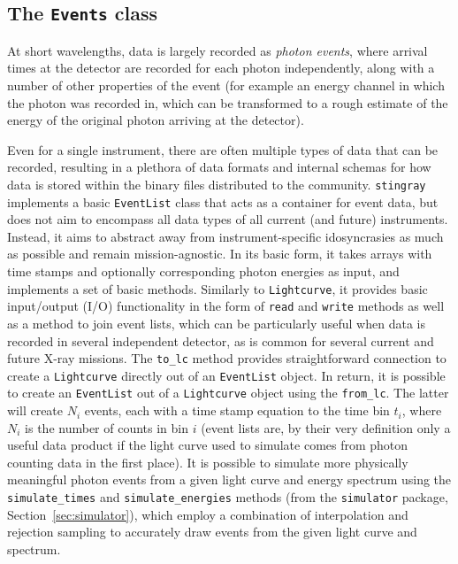 \documentclass[twocolumn]{aastex62}
\newcommand{\stingray}{\texttt{stingray}\xspace}
\newcommand{\lightcurve}{\texttt{Lightcurve}\xspace}
\newcommand{\eventlist}{\texttt{EventList}\xspace}
\begin{document}
\subsection{The \texttt{Events} class}

At short wavelengths, data is largely recorded as \textit{photon events}, where arrival times at the detector are recorded for each photon independently, along with a number of other properties of the event (for example an energy channel in which the photon was recorded in, which can be transformed to a rough estimate of the energy of the original photon arriving at the detector).

Even for a single instrument, there are often multiple types of data that can be recorded, resulting in a plethora of data formats and internal schemas for how data is stored within the binary files distributed to the community. 
\stingray implements a basic \eventlist class that acts as a container for event data, but does not aim to encompass all data types of all current (and future) instruments. 
Instead, it aims to abstract away from instrument-specific idosyncrasies as much as possible and remain mission-agnostic. 
In its basic form, it takes arrays with time stamps and optionally corresponding photon energies as input, and implements a set of basic methods. 
Similarly to \lightcurve, it provides basic input/output (I/O) functionality in the form of \texttt{read} and \texttt{write} methods as well as a method to join event lists, which can be particularly useful when data is recorded in several independent detector, as is common for several current and future X-ray missions. 
The \verb|to_lc| method provides straightforward connection to create a \lightcurve directly out of an \eventlist object. 
In return, it is possible to create an \eventlist out of a \lightcurve object using the \verb|from_lc|. 
The latter will create $N_i$ events, each with a time stamp equation to the time bin $t_i$, where $N_i$ is the number of counts in bin $i$ (event lists are, by their very definition only a useful data product if the light curve used to simulate comes from photon counting data in the first place). 
It is possible to simulate more physically meaningful photon events from a given light curve and energy spectrum using the \verb|simulate_times| and \verb|simulate_energies| methods (from the \texttt{simulator} package, Section~\ref{sec:simulator}), which employ a combination of interpolation and rejection sampling to accurately draw events from the given light curve and spectrum.
\end{document}
